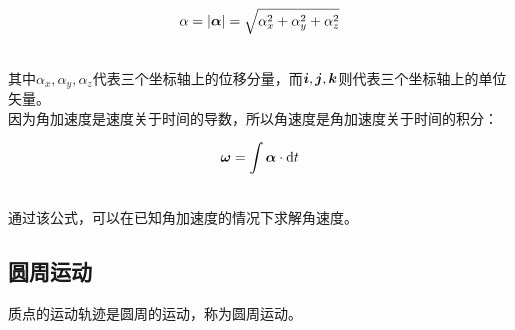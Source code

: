 \documentclass[UTF8]{ctexart}
\newcommand*{\veb}[1]{\vb*{#1}}
\newcommand*{\dif}{\mathop{}\!\mathrm{d}}
\begin{document}
    \begin{large}
        \begin{equation*}
            \alpha=|\veb{\alpha}|=\sqrt{\alpha_x^2+\alpha_y^2+\alpha_z^2}
        \end{equation*}
    \end{large}\\
    其中$\alpha_x,\alpha_y,\alpha_z$代表三个坐标轴上的位移分量，而$\veb{i},\veb{j},\veb{k}$则代表三个坐标轴上的单位矢量。\\[4mm]
    因为角加速度是速度关于时间的导数，所以角速度是角加速度关于时间的积分：\vspace{5pt}
    \begin{large}
        \begin{equation*}
            \veb{\omega}=\int \veb{\alpha}\cdot\dif t
        \end{equation*}
    \end{large}\\
    通过该公式，可以在已知角加速度的情况下求解角速度。

\newpage

\subsection{圆周运动}
    质点的运动轨迹是圆周的运动，称为圆周运动。
\end{document}
